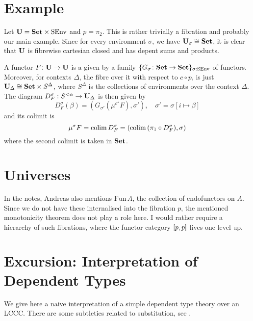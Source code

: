 \documentclass[runningheads,envcountsame,envcountsect,orivec]{llncs}
\begin{document}
\section{Example}
Let $\mathbf{U} = \mathbf{Set} \times \mathrm{SEnv}$ and $p = \pi_2$.
This is rather trivially a fibration and probably our main example.
Since for every environment $\sigma$, we have $\mathbf{U}_\sigma \cong \mathbf{Set}$, it
is clear that $\mathbf{U}$ is fibrewise cartesian closed and has depent sums and
products.

A functor $F \colon \mathbf{U} \rightarrow \mathbf{U}$ is a given by a family
$\{G_\sigma \colon \mathbf{Set} \rightarrow \mathbf{Set}\}_{\sigma : \mathrm{SEnv}}$ of functors.
Moreover, for contexts $\Delta$, the fibre over it with respect to $c \circ p$,
is just $\mathbf{U}_\Delta \cong \mathbf{Set} \times S^\Delta$, where $S^\Delta$ is the
collections of environments over the context $\Delta$.
The diagram $D^\sigma_F : S^{< \alpha} \to \mathbf{U}_\Delta$ is then given by
\begin{equation*}
  D^\sigma_F(\beta) = (G_{\sigma'}(\mu^{\sigma'}F), \sigma'),
  \quad \sigma' = \sigma[i \mapsto \beta]
\end{equation*}
and its colimit is
\begin{equation*}
  \mu^{\sigma}F = \operatorname{colim} D^\sigma_F
  = (\operatorname{colim} \, (\pi_1 \circ D^{\sigma}_F), \sigma)
\end{equation*}
where the second colimit is taken in $\mathbf{Set}$.


\section{Universes}
In the notes, Andreas also mentions $\mathrm{Fun} \, A$, the collection of
endofunctors on $A$.
Since we do not have these internalised into the fibration $p$, the mentioned
monotonicity theorem does not play a role here.
I would rather require a hierarchy of such fibrations, where the functor
category $\left[ p, p \right]$ lives one level up.

\section{Excursion: Interpretation of Dependent Types}
We give here a naive interpretation of a simple dependent type theory over an
LCCC.
There are some subtleties related to substitution, see
\cite{Jacobs-CatLog, Hofmann-LCCC}.
\end{document}
